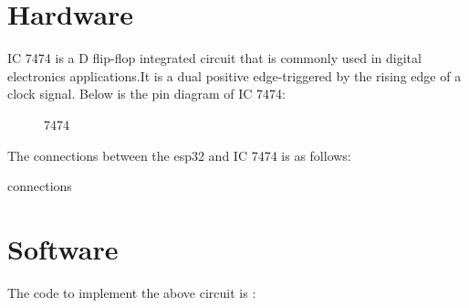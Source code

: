 \documentclass{article}
\begin{document}
\section{Hardware}

  IC 7474 is a D flip-flop integrated circuit that is commonly used in digital electronics applications.It is a dual positive edge-triggered by the rising edge of a clock signal. Below is the pin diagram of IC 7474:
  \begin{figure}[h]
    \centering
    
    \caption{7474}
    \label{fig:2}
  \end{figure}


The connections between the esp32 and IC 7474 is as follows:
  \begin{table}[h]
    \begin{center}
      
      \caption{connections}
      \label{table:3}
    \end{center}
  \end{table}


\section{Software}

The code to implement the above circuit is : \\

    
\end{document}
